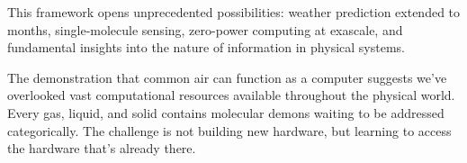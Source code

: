 This framework opens unprecedented possibilities: weather prediction extended to months, single-molecule sensing, zero-power computing at exascale, and fundamental insights into the nature of information in physical systems.

The demonstration that common air can function as a computer suggests we've overlooked vast computational resources available throughout the physical world. Every gas, liquid, and solid contains molecular demons waiting to be addressed categorically. The challenge is not building new hardware, but learning to access the hardware that's already there.
